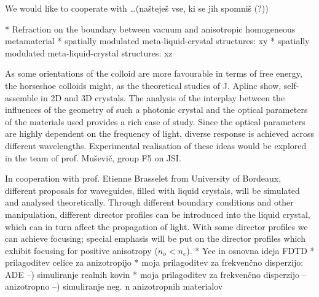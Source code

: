 \documentclass[a4paper,11pt]{article}
\begin{document}

We would like to cooperate with \ldots (našteješ vse, ki se jih spomniš (?))


%
* Refraction on the boundary between vacuum and anisotropic homogeneous metamaterial
* spatially modulated meta-liquid-crystal structures: xy
* spatially modulated meta-liquid-crystal structures: xz

%
As some orientations of the colloid are more favourable in terms of free energy, the horseshoe colloids might, as the theoretical studies of J. Aplinc \cite{jure-HS} show, self-assemble in 2D and 3D crystals. 
The analysis of the interplay between the influences of the geometry of such a photonic crystal and the optical parameters of the materials used provides a rich case of study. 
Since the optical parameters are highly dependent on the frequency of light, diverse response is achieved across different wavelengths. 
Experimental realisation of these ideas would be explored in the team of prof. Muševič, group F5 on JSI. 


In cooperation with prof. Etienne Brasselet from University of Bordeaux, different proposals for waveguides, filled with liquid crystals, will be simulated and analysed theoretically. 
Through different boundary conditions and other manipulation, different director profiles can be introduced into the liquid crystal, which can in turn affect the propagation of light. 
With some director profiles we can achieve focusing; special emphasis will be put on the director profiles which exhibit focusing for positive anisotropy ($n_{o} < n_e$).
% 
%
%
%
% 
% 
%
%
%
* Yee in osnovna ideja FDTD
* prilagoditev celice za anizotropijo
* moja prilagoditev za frekvenčno disperzijo: ADE --) simuliranje realnih kovin
* moja prilagoditev za frekvenčno disperzijo -- anizotropno --) simuliranje neg. n anizotropnih materialov
\end{document}
